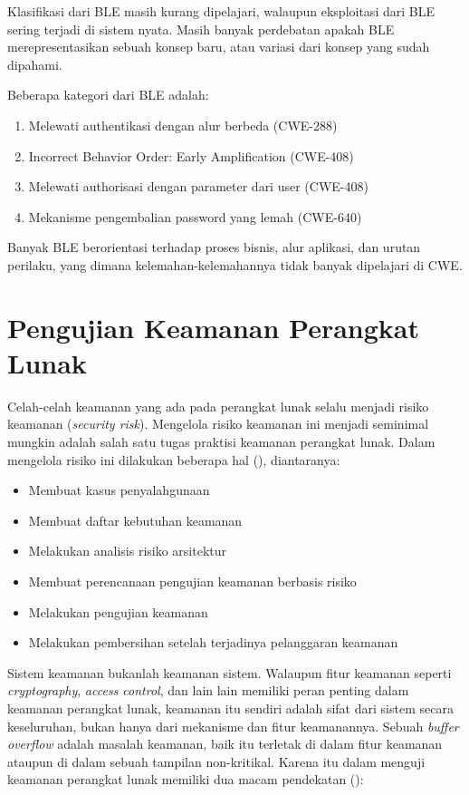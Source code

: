 Klasifikasi dari BLE masih kurang dipelajari, walaupun eksploitasi dari BLE
sering terjadi di sistem nyata. Masih banyak perdebatan apakah BLE merepresentasikan
sebuah konsep baru, atau variasi dari konsep yang sudah dipahami.

Beberapa kategori dari BLE adalah:

\begin{enumerate}
      \item Melewati authentikasi dengan alur berbeda (CWE-288)
      \item Incorrect Behavior Order: Early Amplification (CWE-408)
      \item Melewati authorisasi dengan parameter dari user (CWE-408)
      \item Mekanisme pengembalian password yang lemah (CWE-640)
\end{enumerate}

Banyak BLE berorientasi terhadap proses bisnis, alur aplikasi, dan urutan perilaku,
yang dimana kelemahan-kelemahannya tidak banyak dipelajari di CWE.


\section{Pengujian Keamanan Perangkat Lunak}

Celah-celah keamanan yang ada pada perangkat lunak selalu menjadi risiko keamanan (\emph{security risk}).
Mengelola risiko keamanan ini menjadi seminimal mungkin adalah salah satu tugas praktisi keamanan perangkat lunak.
Dalam mengelola risiko ini dilakukan beberapa hal (\cite{grawsectest}), diantaranya:

\begin{itemize}
      \item Membuat kasus penyalahgunaan
      \item Membuat daftar kebutuhan keamanan
      \item Melakukan analisis risiko arsitektur
      \item Membuat perencanaan pengujian keamanan berbasis risiko
      \item Melakukan pengujian keamanan
      \item Melakukan pembersihan setelah terjadinya pelanggaran keamanan
\end{itemize}

Sistem keamanan bukanlah keamanan sistem. Walaupun fitur keamanan seperti \emph{cryptography},
\emph{access control}, dan lain lain memiliki peran penting dalam keamanan perangkat lunak,
keamanan itu sendiri adalah sifat dari sistem secara keseluruhan, bukan hanya dari mekanisme
dan fitur keamanannya. Sebuah \emph{buffer overflow} adalah masalah keamanan, baik itu terletak di dalam
fitur keamanan ataupun di dalam sebuah tampilan non-kritikal.
Karena itu dalam menguji keamanan perangkat lunak memiliki dua macam pendekatan (\cite{grawsec}):

